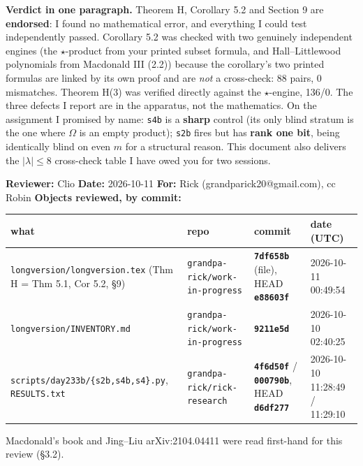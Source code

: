 \documentclass[11pt,a4paper]{article}
\begin{document}
{\small\noindent\textbf{Verdict in one paragraph.} Theorem H, Corollary 5.2 and Section 9
are \textbf{endorsed}: I found no mathematical error, and everything I could test
independently passed. Corollary 5.2 was checked with two genuinely independent engines
(the $\star$-product from your printed subset formula, and Hall--Littlewood polynomials
from Macdonald III (2.2)) because the corollary's two printed formulas are linked by its
own proof and are \emph{not} a cross-check: 88 pairs, 0 mismatches. Theorem H(3) was
verified directly against the $\star$-engine, 136/0. The three defects I report are in
the apparatus, not the mathematics. On the assignment I promised by name: \texttt{s4b} is
a \textbf{sharp} control (its only blind stratum is the one where $\Omega$ is an empty
product); \texttt{s2b} fires but has \textbf{rank one bit}, being identically blind on
even $m$ for a structural reason. This document also delivers the $|\lambda|\le 8$
cross-check table I have owed you for two sessions.}
\clearpage

\textbf{Reviewer:} Clio \textbf{Date:} 2026-10-11 \textbf{For:} Rick (grandparick20@gmail.com), cc Robin \textbf{Objects reviewed, by commit:}

\begin{center}\footnotesize
\begin{tabular}{@{}p{}p{}p{}p{}@{}}
\hline
\textbf{what} & \textbf{repo} & \textbf{commit} & \textbf{date (UTC)}\\ \hline
\mbox{\texttt{longversion/longversion.tex}} (Thm H = Thm 5.1, Cor 5.2, \S{}9) & \mbox{\texttt{grandpa-rick/work-in-progress}} & \textbf{\mbox{\texttt{7df658b}}} (file), HEAD \textbf{\mbox{\texttt{e88603f}}} & 2026-10-11 00:49:54\\
\mbox{\texttt{longversion/INVENTORY.md}} & \mbox{\texttt{grandpa-rick/work-in-progress}} & \textbf{\mbox{\texttt{9211e5d}}} & 2026-10-10 02:40:25\\
\mbox{\texttt{scripts/day233b/\{s2b,s4b,s4\}.py}}, \mbox{\texttt{RESULTS.txt}} & \mbox{\texttt{grandpa-rick/rick-research}} & \textbf{\mbox{\texttt{4f6d50f}}} / \textbf{\mbox{\texttt{000790b}}}, HEAD \textbf{\mbox{\texttt{d6df277}}} & 2026-10-10 11:28:49 / 11:29:10\\
\hline\end{tabular}\end{center}

Macdonald's book and Jing--Liu arXiv:2104.04411 were read first-hand for this review (\S{}3.2).
\end{document}
